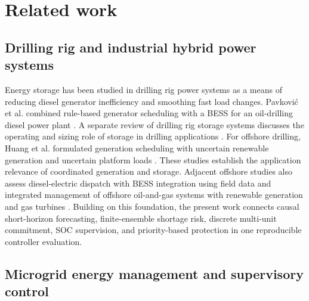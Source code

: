 \section{Related work}\label{related-work}

\subsection{Drilling rig and industrial hybrid power systems}

Energy storage has been studied in drilling rig power systems as a means of
reducing diesel generator inefficiency and smoothing fast load changes.
Pavkovi\'{c} et al. combined rule-based generator scheduling with a BESS for
an oil-drilling diesel power plant \citep{pavkovic2016oil}. A separate review
of drilling rig storage systems discusses the operating and sizing role of
storage in drilling applications \citep{chupin2021drillingstorage}. For
offshore drilling, Huang et al. formulated generation scheduling with
uncertain renewable generation and uncertain platform loads
\citep{huang2019drilling}. These studies establish the application relevance
of coordinated generation and storage. Adjacent offshore studies also assess
diesel-electric dispatch with BESS integration using field data
\citep{peixoto2024psv} and integrated management of offshore oil-and-gas
systems with renewable generation and gas turbines \citep{banihabib2023offshore}.
Building on this foundation, the present work connects causal short-horizon
forecasting, finite-ensemble shortage risk, discrete multi-unit commitment, SOC
supervision, and priority-based protection in one reproducible controller
evaluation.

\subsection{Microgrid energy management and supervisory control}

